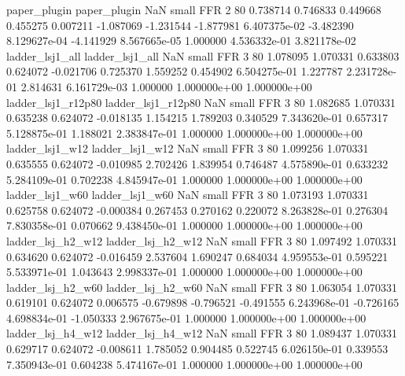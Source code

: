             paper_plugin             paper_plugin                   NaN      small      FFR                 2 80 0.738714       0.746833 0.449668       0.455275    0.007211     -1.087069     -1.231544    -1.877981   6.407375e-02 -3.482390 8.129627e-04    -4.141929   8.567665e-05            1.000000    4.536332e-01        3.821178e-02
         ladder_lsj1_all          ladder_lsj1_all                   NaN      small      FFR                 3 80 1.078095       1.070331 0.633803       0.624072   -0.021706      0.725370      1.559252     0.454902   6.504275e-01  1.227787 2.231728e-01     2.814631   6.161729e-03            1.000000    1.000000e+00        1.000000e+00
      ladder_lsj1_r12p80       ladder_lsj1_r12p80                   NaN      small      FFR                 3 80 1.082685       1.070331 0.635238       0.624072   -0.018135      1.154215      1.789203     0.340529   7.343620e-01  0.657317 5.128875e-01     1.188021   2.383847e-01            1.000000    1.000000e+00        1.000000e+00
         ladder_lsj1_w12          ladder_lsj1_w12                   NaN      small      FFR                 3 80 1.099256       1.070331 0.635555       0.624072   -0.010985      2.702426      1.839954     0.746487   4.575890e-01  0.633232 5.284109e-01     0.702238   4.845947e-01            1.000000    1.000000e+00        1.000000e+00
         ladder_lsj1_w60          ladder_lsj1_w60                   NaN      small      FFR                 3 80 1.073193       1.070331 0.625758       0.624072   -0.000384      0.267453      0.270162     0.220072   8.263828e-01  0.276304 7.830358e-01     0.070662   9.438450e-01            1.000000    1.000000e+00        1.000000e+00
       ladder_lsj_h2_w12        ladder_lsj_h2_w12                   NaN      small      FFR                 3 80 1.097492       1.070331 0.634620       0.624072   -0.016459      2.537604      1.690247     0.684034   4.959553e-01  0.595221 5.533971e-01     1.043643   2.998337e-01            1.000000    1.000000e+00        1.000000e+00
       ladder_lsj_h2_w60        ladder_lsj_h2_w60                   NaN      small      FFR                 3 80 1.063054       1.070331 0.619101       0.624072    0.006575     -0.679898     -0.796521    -0.491555   6.243968e-01 -0.726165 4.698834e-01    -1.050333   2.967675e-01            1.000000    1.000000e+00        1.000000e+00
       ladder_lsj_h4_w12        ladder_lsj_h4_w12                   NaN      small      FFR                 3 80 1.089437       1.070331 0.629717       0.624072   -0.008611      1.785052      0.904485     0.522745   6.026150e-01  0.339553 7.350943e-01     0.604238   5.474167e-01            1.000000    1.000000e+00        1.000000e+00

